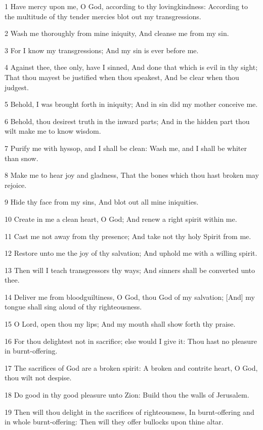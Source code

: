 \par 1 Have mercy upon me, O God, according to thy lovingkindness: According to the multitude of thy tender mercies blot out my transgressions.
\par 2 Wash me thoroughly from mine iniquity, And cleanse me from my sin.
\par 3 For I know my transgressions; And my sin is ever before me.
\par 4 Against thee, thee only, have I sinned, And done that which is evil in thy sight; That thou mayest be justified when thou speakest, And be clear when thou judgest.
\par 5 Behold, I was brought forth in iniquity; And in sin did my mother conceive me.
\par 6 Behold, thou desirest truth in the inward parts; And in the hidden part thou wilt make me to know wisdom.
\par 7 Purify me with hyssop, and I shall be clean: Wash me, and I shall be whiter than snow.
\par 8 Make me to hear joy and gladness, That the bones which thou hast broken may rejoice.
\par 9 Hide thy face from my sins, And blot out all mine iniquities.
\par 10 Create in me a clean heart, O God; And renew a right spirit within me.
\par 11 Cast me not away from thy presence; And take not thy holy Spirit from me.
\par 12 Restore unto me the joy of thy salvation; And uphold me with a willing spirit.
\par 13 Then will I teach transgressors thy ways; And sinners shall be converted unto thee.
\par 14 Deliver me from bloodguiltiness, O God, thou God of my salvation; [And] my tongue shall sing aloud of thy righteousness.
\par 15 O Lord, open thou my lips; And my mouth shall show forth thy praise.
\par 16 For thou delightest not in sacrifice; else would I give it: Thou hast no pleasure in burnt-offering.
\par 17 The sacrifices of God are a broken spirit: A broken and contrite heart, O God, thou wilt not despise.
\par 18 Do good in thy good pleasure unto Zion: Build thou the walls of Jerusalem.
\par 19 Then will thou delight in the sacrifices of righteousness, In burnt-offering and in whole burnt-offering: Then will they offer bullocks upon thine altar.


